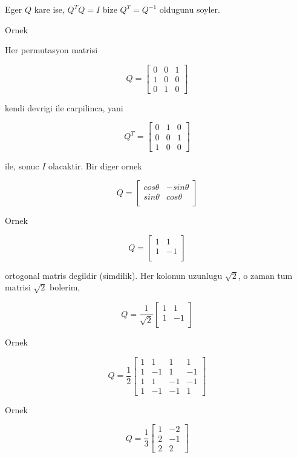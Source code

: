 \documentclass[12pt,fleqn]{article}\usepackage{../common}
\begin{document}
Eger $Q$ kare ise, $Q^TQ = I$  bize $Q^T = Q^{-1}$ oldugunu soyler. 

Ornek 

Her permutasyon matrisi 

\[ 
Q = 
\left[\begin{array}{rrr}
0 & 0 & 1 \\
1 & 0 & 0 \\
0 & 1 & 0 
\end{array}\right]
 \]

kendi devrigi ile carpilinca, yani 

\[ 
Q^T = 
\left[\begin{array}{rrr}
0 & 1 & 0 \\
0 & 0 & 1 \\
1 & 0 & 0 
\end{array}\right]
 \]

ile, sonuc $I$ olacaktir. Bir diger ornek 

\[ Q = 
\left[\begin{array}{cc}
cos \theta & -sin \theta \\
sin \theta & cos \theta \\
\end{array}\right]
 \]


Ornek

\[ Q = 
\left[\begin{array}{cc}
1 & 1 \\
1 & -1 \\
\end{array}\right]
 \]

ortogonal matris degildir (simdilik). Her kolonun uzunlugu $\sqrt{2}$, o
zaman tum matrisi $\sqrt{2}$ bolerim,

\[ Q = \frac{1}{\sqrt{2}}
\left[\begin{array}{cc}
1 & 1 \\
1 & -1 \\
\end{array}\right]
 \]

Ornek 

\[ Q = \frac{ 1}{2}
\left[\begin{array}{rrrr}
1 & 1& 1& 1 \\
1 & -1& 1& -1 \\
1 & 1& -1& -1 \\
1 & -1& -1& 1 
\end{array}\right]
 \]

Ornek 

\[ Q = \frac{ 1}{3}
\left[\begin{array}{rr}
1 & -2 \\
2 & -1 \\
2 & 2 
\end{array}\right]
 \]
\end{document}
